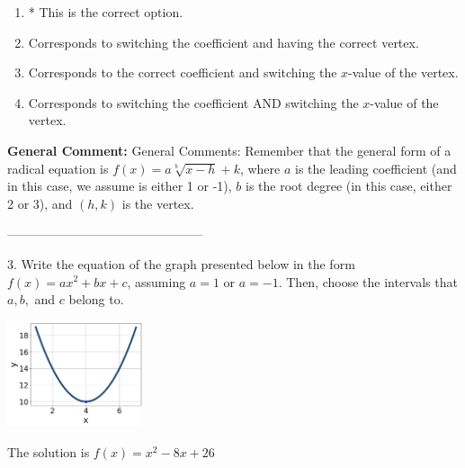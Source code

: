 \documentclass{extbook}[14pt]
\begin{document}
\begin{enumerate}[label=\Alph*.] 
\item * This is the correct option.  
\item Corresponds to switching the coefficient and having the correct vertex.  
\item Corresponds to the correct coefficient and switching the $x$-value of the vertex.  
\item Corresponds to switching the coefficient AND switching the $x$-value of the vertex.  
\end{enumerate} 
 
\textbf{General Comment:} General Comments: Remember that the general form of a radical equation is $ f(x) = a \sqrt[b]{x - h} + k $, where $a$ is the leading coefficient (and in this case, we assume is either 1 or -1), $b$ is the root degree (in this case, either 2 or 3), and $(h, k)$ is the vertex. 

-----------------------------------------------

3. Write the equation of the graph presented below in the form $f(x)=ax^2+bx+c$, assuming  $a=1$ or $a=-1$. Then, choose the intervals that $a, b,$ and $c$ belong to.
\begin{center} \includegraphics[width=0.3\textwidth]{../Figures/quadraticGraphToEquationC.png} \end{center} 

The solution is $ f(x) = x^{2} -8 x + 26 $ 
\end{document}
